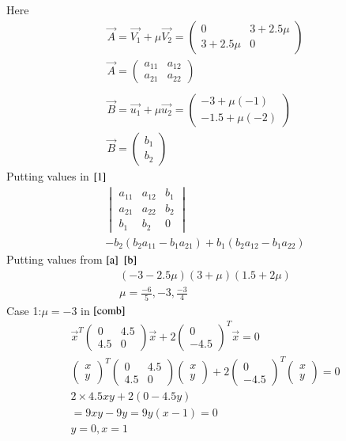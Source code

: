 \documentclass[a5paper,10pt]{article}
\begin{document}
Here
\begin{align}
    \vec{A}=\vec{V_1}+\mu \vec{V_2}=\begin{pmatrix}0&3+2.5\mu\\3+2.5\mu&0\end{pmatrix} \label{a} \\
    \vec{A}=\begin{pmatrix}a_{11}&a_{12}\\a_{21}&a_{22}\end{pmatrix}\\ \\
    \vec{B}=\vec{u_1}+\mu \vec{u_2}=\begin{pmatrix}-3+\mu(-1)\\-1.5+\mu(-2)\end{pmatrix} \label{b}\\ \vec{B}=\begin{pmatrix}b_{1}\\b_{2}\end{pmatrix}
\end{align}
Putting values in $\eqref{1}$
\begin{align}
    \begin{vmatrix}a_{11}&a_{12}&b_1\\a_{21}&a_{22}&b_2\\b_1&b_2&0\end{vmatrix}\\
    -b_2(b_2a_{11}-b_1a_{21})+b_1(b_2a_{12}-b_1a_{22})
\end{align}
Putting values from $\eqref{a}$ $\eqref{b}$
\begin{align}
    (-3-2.5\mu)(3+\mu)(1.5+2\mu)\\
    \mu=\frac{-6}{5},-3,\frac{-3}{4}
\end{align}
Case 1:$\mu=-3$ in $\eqref{comb}$
\begin{align}
    \vec{x}^T\begin{pmatrix}0&4.5\\4.5&0\end{pmatrix}\vec{x}+2\begin{pmatrix}0\\-4.5\end{pmatrix}^T\vec{x}=0\\
    \begin{pmatrix}x\\y\end{pmatrix}^T\begin{pmatrix}0&4.5\\4.5&0\end{pmatrix}\begin{pmatrix}x\\y\end{pmatrix}+2\begin{pmatrix}0\\-4.5\end{pmatrix}^T\begin{pmatrix}x\\y\end{pmatrix}=0\\
    2\times4.5xy+2(0-4.5y)\\=9xy-9y=9y(x-1)=0\\
    y=0,x=1
\end{align}
\end{document}
